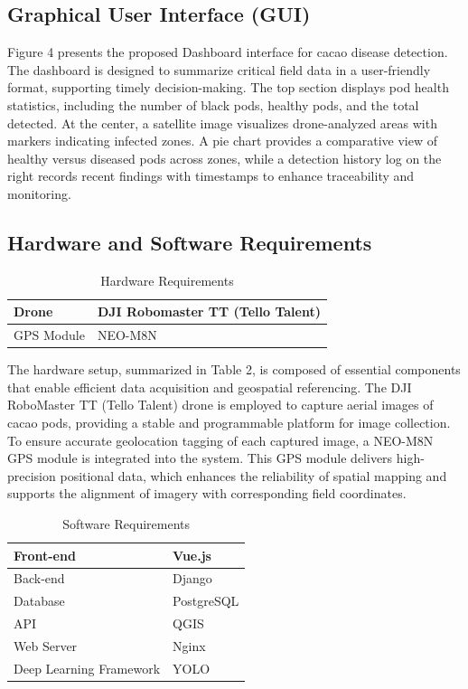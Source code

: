 	\subsection{Graphical User Interface (GUI)}
	Figure 4 presents the proposed Dashboard interface for cacao disease detection. The dashboard is designed to summarize critical field data in a user-friendly format, supporting timely decision-making. The top section displays pod health statistics, including the number of black pods, healthy pods, and the total detected. At the center, a satellite image visualizes drone-analyzed areas with markers indicating infected zones. A pie chart provides a comparative view of healthy versus diseased pods across zones, while a detection history log on the right records recent findings with timestamps to enhance traceability and monitoring.
	
	\subsection{Hardware and Software Requirements}
	
	\begin{table}[H]
		\centering
		\caption{Hardware Requirements}
		\label{tab:hardreq}
		\begin{tabular}{ll}
			\toprule
			Drone & DJI Robomaster TT (Tello Talent) \\
			\midrule
			GPS Module & NEO-M8N \\
			\bottomrule
		\end{tabular}
	\end{table}
	
	The hardware setup, summarized in Table 2, is composed of essential components that enable efficient data acquisition and geospatial referencing. The DJI RoboMaster TT (Tello Talent) drone is employed to capture aerial images of cacao pods, providing a stable and programmable platform for image collection. To ensure accurate geolocation tagging of each captured image, a NEO-M8N GPS module is integrated into the system. This GPS module delivers high-precision positional data, which enhances the reliability of spatial mapping and supports the alignment of imagery with corresponding field coordinates.
	
	\begin{table}[H]
		\centering
		\caption{Software Requirements}
		\label{tab:softreq}
		\begin{tabular}{ll}
			\toprule
			Front-end & Vue.js \\
			\midrule
			Back-end & Django \\
			\midrule
			Database & PostgreSQL \\
			\midrule
			API & QGIS \\
			\midrule
			Web Server & Nginx \\
			\midrule
			Deep Learning Framework & YOLO \\
			\bottomrule
		\end{tabular}
	\end{table}
	
